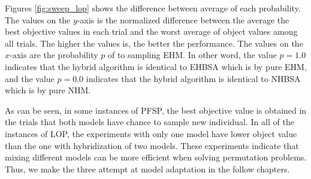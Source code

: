 Figures \ref{fig:sweep_lop} shows the difference between average of each probability. The values on the $y$-axis is the normalized difference between the average the best objective values in each trial and the worst average of object values among all trials. The higher the values is, the better the performance. The values on the $x$-axis are the probability $p$ of to sampling EHM. In other word, the value $p=1.0$ indicates that the hybrid algorithm is identical to EHBSA which is by pure EHM, and the value $p=0.0$ indicates that the hybrid algorithm is identical to NHBSA which is by pure NHM.

As can be seen, in some instances of PFSP, the best objective value is obtained in the trials that both models have chance to sample new individual. In all of the instances of LOP, the experiments with only one model have lower object value than the one with hybridization of two models. These experiments indicate that mixing different models can be more efficient when solving permutation problems. Thus, we make the three attempt at model adaptation in the follow chapters.


